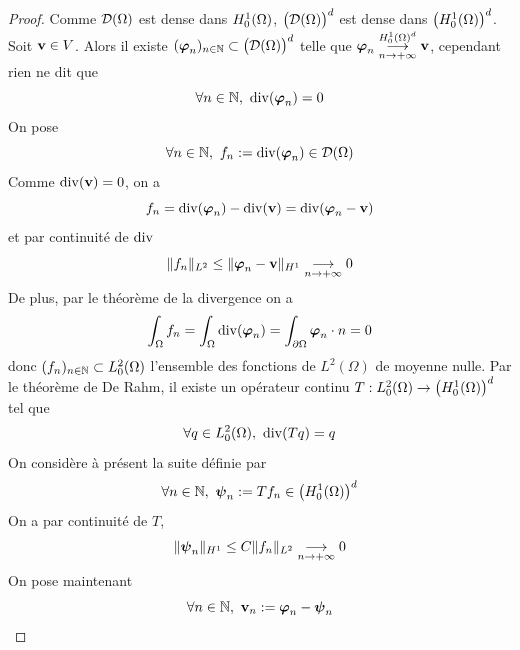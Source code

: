 \begin{appendices}
\begin{proof}
    Comme $\mathcal{D}(\Omega)$ est dense dans $H^1_0(\Omega)$, $\big(\mathcal{D}(\Omega)\big)^d$
    est dense dans $\big(H^1_0(\Omega)\big)^d$. Soit $\bm{\mathrm{v}} \in V$. Alors il 
    existe $(\bm{\mathrm{\varphi}}_n)_{n \in \mathbb{N}} \subset \big(\mathcal{D}(\Omega)\big)^d$
    telle que $\bm{\mathrm{\varphi}}_n\underset{n \to +\infty}{\overset{H^1_0(\Omega)^d}{\longrightarrow}} \bm{\mathrm{v}}$, 
    cependant rien ne dit que 
    \begin{equation*}
        \forall n \in \bbN, \ \Div(\bfm{\varphi}_n) = 0
    \end{equation*}
    On pose 
    \begin{equation*}
        \forall n \in \mathbb{N}, \ f_n := \mathrm{div}(\bm{\mathrm{\varphi}}_n) \in \mathcal{D}(\Omega)
    \end{equation*}
    Comme $\mathrm{div}(\bm{\mathrm{v}})=0$, on a 
    \begin{equation*}
        f_n = \mathrm{div}(\bm{\mathrm{\varphi}}_n) - \mathrm{div}(\bm{\mathrm{v}}) = \mathrm{div}(\bm{\mathrm{\varphi}}_n-\bm{\mathrm{v}})
    \end{equation*}
    et par continuité de $\mathrm{div}$
    \begin{equation*}
        \|f_n\|_{L^2} \leq \|\bm{\mathrm{\varphi}}_n -\bm{\mathrm{v}}\|_{H^1} \underset{n \to +\infty}{\longrightarrow} 0
    \end{equation*}
    De plus, par le théorème de la divergence on a
    \begin{equation*}
        \int_{\Omega}f_n = \int_{\Omega} \mathrm{div}(\bm{\mathrm{\varphi}}_n) = \int_{\partial \Omega} \bm{\mathrm{\varphi}}_n \cdot n = 0
    \end{equation*}
    donc $(f_n)_{n \in \mathbb{N}} \subset L^2_0(\Omega)$ l'ensemble des fonctions de $L^2(\Omega)$ de moyenne nulle.
    Par le théorème de De Rahm, il existe un opérateur continu
    $T : L^2_0(\Omega) \rightarrow \big(H^1_0(\Omega)\big)^d$ tel que 
    \begin{equation*}
        \forall q \in L_0^2(\Omega), \ \mathrm{div}(Tq) = q
    \end{equation*}
    On considère à présent la suite définie par 
    \begin{equation*}
        \forall n \in \bbN, \ \bfm{\psi}_n := Tf_n \in \big(\Hone\big)^d
    \end{equation*}
    On a par continuité de $T$, 
    \begin{equation*}
        \|\bm{\mathrm{\psi}}_n\|_{H^1} \leq C \|f_n\|_{L^2} \underset{n \to +\infty}{\longrightarrow} 0
    \end{equation*}
    On pose maintenant 
    \begin{equation*}
        \forall n \in \bbN, \ \bfm{v}_n := \bfm{\varphi}_n - \bfm{\psi}_n 

\end{equation*}
\end{proof}
\end{appendices}
